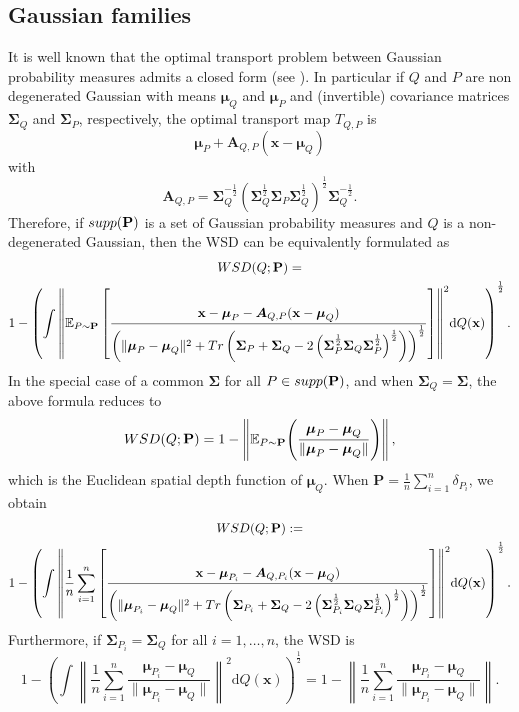 \documentclass{imsart}
\numberwithin{equation}{section}
\def\E{\mathbb{E}}
\def\x{\mathbf{x}}
\def\E{\mathbb E}
\def\x{\mathbf x}
\def\bSigma{\boldsymbol{\Sigma}}
\def\bA{\boldsymbol{A}}
\begin{document}
\subsection{Gaussian families}\label{gaussian_exp}
It is well known that the optimal transport problem between Gaussian probability measures admits a closed form (see \cite{CuestaAlbertos1996OnLB}). In particular if $Q$ and $P$ are non degenerated Gaussian with means $\boldsymbol{\mu}_Q$ and $\boldsymbol{\mu}_P$ and (invertible) covariance matrices $ \bSigma_Q $ and $\bSigma_P$, respectively, the optimal transport map $T_{Q,P}$ is 
$$ \boldsymbol{\mu}_P+
\bA_{Q,P}
(\x-\boldsymbol{\mu}_Q) $$
with
$$
\bA_{Q,P} = 
\bSigma_Q^{-\frac{1}{2}}
\left( 
\bSigma_Q^{\frac{1}{2}}
\bSigma_P
\bSigma_Q^{\frac{1}{2}}
\right)^{\frac{1}{2}}
\bSigma_Q^{-\frac{1}{2}}.
$$
Therefore, if ${\rm supp}({\bf P})$ is a set of Gaussian probability measures and $Q$ is a non-degenerated Gaussian, 
then the WSD can be equivalently formulated as
\begin{multline*}
	{\rm WSD}(Q; {\bf P}) =\\
	1-  \left(\int{ \left\|\E_{P\sim \mathbf{P}}\left[  \frac{\x-\boldsymbol{\mu}_P-\bA_{Q,P}(\x-\boldsymbol{\mu}_Q) }{\left(\|\boldsymbol{\mu}_P-\boldsymbol{\mu}_Q\|^2+{\rm Tr}\left(\bSigma_P+\bSigma_Q-2\left(\bSigma^{\frac{1}{2}}_P \bSigma_Q \bSigma^{\frac{1}{2}}_P\right)^{\frac{1}{2}}\right)\right)^{\frac{1}{2}}}\right]\right\|^2} \mathrm{d}Q(\x)\right)^{\frac{1}{2}}. 
\end{multline*}
In the special case of a common $\bSigma$ for all $P\in {\rm supp}(\mathbf{P})$, and when $\bSigma_Q  = \bSigma$, the above formula reduces to
\begin{equation*}
	{\rm WSD}(Q; {\bf P})=
	1- \left\|\E_{P\sim \mathbf{P}}  \Bigg( \frac{\boldsymbol{\mu}_P-\boldsymbol{\mu}_Q }{\|\boldsymbol{\mu}_P-\boldsymbol{\mu}_Q\|} \Bigg) \right\|,
\end{equation*}
which is the Euclidean spatial depth function of $\boldsymbol{\mu}_Q$.
When $\mathbf{P} = \frac{1}{n}\sum_{i=1}^n \delta_{P_i}$, we obtain
\begin{multline*}
	{\rm WSD}(Q; {\bf P}):=\\
	1 - \left(\int{ \left\|\frac{1}{n} \sum_{i=1}^n \left[  \frac{\x-\boldsymbol{\mu}_{P_i}-\bA_{Q,P_i} (\x-\boldsymbol{\mu}_Q) }{\left(\|\boldsymbol{\mu}_{P_i}-\boldsymbol{\mu}_Q\|^2+{\rm Tr}\left(\bSigma_{P_i}+\bSigma_Q-2\left(\bSigma^{\frac{1}{2}}_{P_i} \bSigma_Q \bSigma^{\frac{1}{2}}_{P_i}\right)^{\frac{1}{2}}\right)\right)^{\frac{1}{2}}}\right]\right\|^2} \mathrm{d}Q(\x)\right)^{\frac{1}{2}}.  
\end{multline*}
Furthermore, if $\bSigma_{P_i}=\bSigma_{Q}$ for all $i=1, \dots, n$, the WSD is 
$$ 1- \left(\int{ \left\| \frac{1}{n}\sum_{i=1}^n   \frac{\boldsymbol{\mu}_{P_i}- \boldsymbol{\mu}_Q }{\|\boldsymbol{\mu}_{P_i}-\boldsymbol{\mu}_Q\|}\right\|^2} \mathrm{d}Q(\x)\right)^{\frac{1}{2}}=1- \left\|\frac{1}{n} \sum_{i=1}^n   \frac{\boldsymbol{\mu}_{P_i}- \boldsymbol{\mu}_Q }{\|\boldsymbol{\mu}_{P_i}-\boldsymbol{\mu}_Q\|}\right\|.$$
\end{document}
